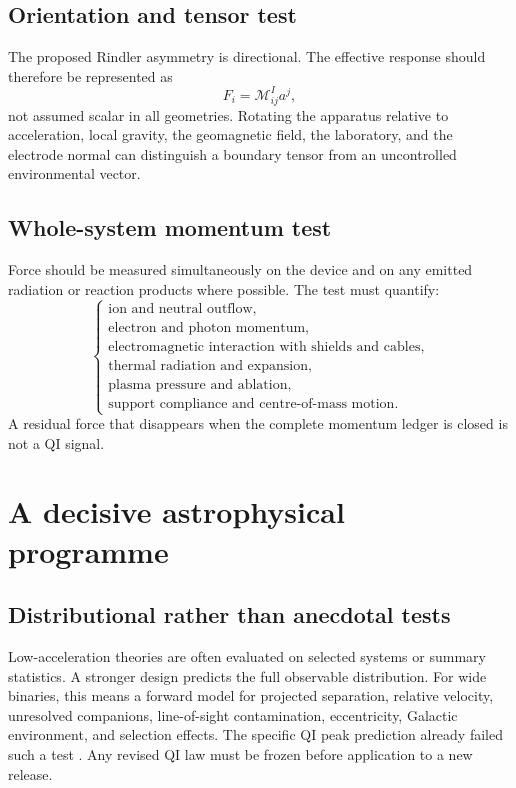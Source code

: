 \documentclass[11pt]{article}
\newcommand{\Mcal}{\mathcal{M}}
\begin{document}
\subsection{Orientation and tensor test}

The proposed Rindler asymmetry is directional. The effective response should therefore be represented as
\begin{equation}
    F_i=\Mcal^{I}_{ij}a^{j},
\end{equation}
not assumed scalar in all geometries. Rotating the apparatus relative to acceleration, local gravity, the geomagnetic field, the laboratory, and the electrode normal can distinguish a boundary tensor from an uncontrolled environmental vector.

\subsection{Whole-system momentum test}

Force should be measured simultaneously on the device and on any emitted radiation or reaction products where possible. The test must quantify:
\begin{equation}
\left\{
\begin{array}{l}
\text{ion and neutral outflow},\\
\text{electron and photon momentum},\\
\text{electromagnetic interaction with shields and cables},\\
\text{thermal radiation and expansion},\\
\text{plasma pressure and ablation},\\
\text{support compliance and centre-of-mass motion}.
\end{array}
\right.
\end{equation}
A residual force that disappears when the complete momentum ledger is closed is not a QI signal.

\section{A decisive astrophysical programme}
\label{sec:astro_programme}

\subsection{Distributional rather than anecdotal tests}

Low-acceleration theories are often evaluated on selected systems or summary statistics. A stronger design predicts the full observable distribution. For wide binaries, this means a forward model for projected separation, relative velocity, unresolved companions, line-of-sight contamination, eccentricity, Galactic environment, and selection effects. The specific QI peak prediction already failed such a test \cite{Banik2024}. Any revised QI law must be frozen before application to a new release.
\end{document}

